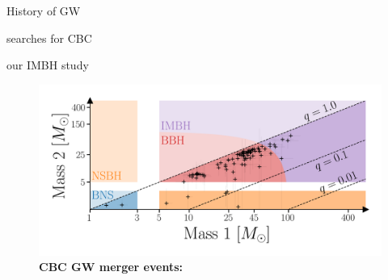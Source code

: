 History of GW 

searches for CBC 

our IMBH study 




\begin{figure}
\begin{center}
  \centerline{\includegraphics[width=1.1\linewidth]{src/figures/gw_catalog.png}}
  \caption{\textbf{CBC GW merger events:}  }
  \label{fig:cbc_mergers}
\end{center}
\end{figure}


